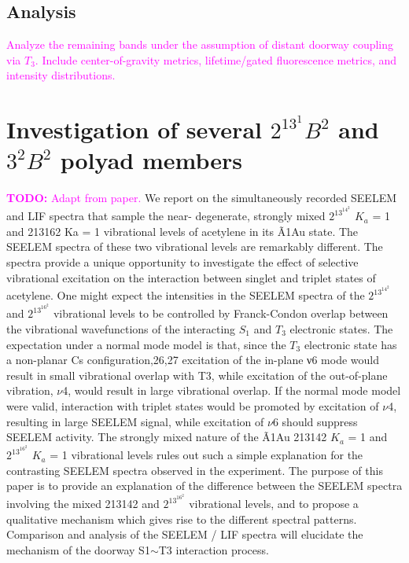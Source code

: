\documentclass[12pt,draft]{mitthesis}
\newcommand{\TODO} [1]{\textcolor{magenta}{\textbf{TODO:} #1}}
\newcommand{\POINT}[1]{\textcolor{magenta}{#1}}
\begin{document}
\subsection{Analysis}

\POINT{Analyze the remaining bands under the assumption of distant
  doorway coupling via $T_3$.  Include center-of-gravity metrics,
  lifetime/gated fluorescence metrics, and intensity distributions.}

\section{Investigation of several $2^13^1B^2$ and $3^2B^2$ polyad
  members}

\TODO{Adapt from paper.}  We report on the simultaneously recorded
SEELEM and LIF spectra that sample the near- degenerate, strongly
mixed $2^13^14^2$ $K_a$ = 1 and 213162 Ka = 1 vibrational levels of
acetylene in its Ã1Au state. The SEELEM spectra of these two
vibrational levels are remarkably different. The spectra provide a
unique opportunity to investigate the effect of selective vibrational
excitation on the interaction between singlet and triplet states of
acetylene. One might expect the intensities in the SEELEM spectra of
the $2^13^14^2$ and $2^13^16^2$ vibrational levels to be controlled by
Franck-Condon overlap between the vibrational wavefunctions of the
interacting $S_1$ and $T_3$ electronic states. The expectation under a
normal mode model is that, since the $T_3$ electronic state has a
non-planar Cs configuration,26,27 excitation of the in-plane ν6 mode
would result in small vibrational overlap with T3, while excitation of
the out-of-plane vibration, $\nu$4, would result in large vibrational
overlap. If the normal mode model were valid, interaction with triplet
states would be promoted by excitation of $\nu$4, resulting in large
SEELEM signal, while excitation of $\nu$6 should suppress SEELEM
activity. The strongly mixed nature of the Ã1Au 213142 $K_a$ = 1 and
$2^13^16^2$ $K_a$ = 1 vibrational levels rules out such a simple
explanation for the contrasting SEELEM spectra observed in the
experiment. The purpose of this paper is to provide an explanation of
the difference between the SEELEM spectra involving the mixed 213142
and $2^13^16^2$ vibrational levels, and to propose a qualitative
mechanism which gives rise to the different spectral
patterns. Comparison and analysis of the SEELEM / LIF spectra will
elucidate the mechanism of the doorway S1$\sim$T3 interaction process.
\end{document}
